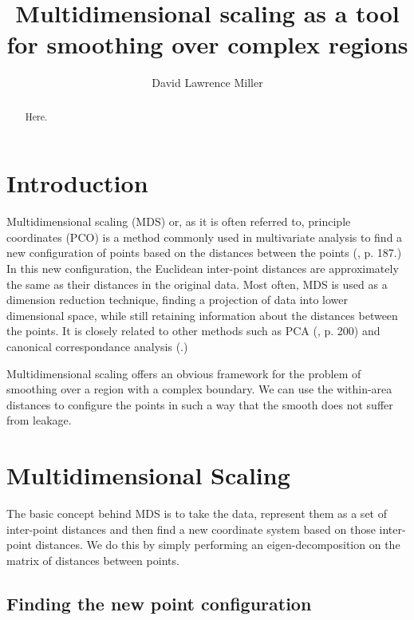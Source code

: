 \documentclass[a4paper,10pt]{amsart}
\title{Multidimensional scaling as a tool for smoothing over complex regions}
\author{David Lawrence Miller}
\begin{document}
 
\begin{abstract}
Here.
\end{abstract}
 
 
\newtheorem{thm}{Theorem}[section]
 
\newtheorem{defn}{Definition}[section]
 
\maketitle


\section{Introduction}

Multidimensional scaling (MDS) or, as it is often referred to, principle coordinates (PCO) is a method commonly used in multivariate analysis to find a new configuration of points based on the distances between the points (\cite{chatfieldcollins}, p. 187.) In this new configuration, the Euclidean inter-point distances are approximately the same as their distances in the original data. Most often, MDS is used as a dimension reduction technique, finding a projection of data into lower dimensional space, while still retaining information about the distances between the points. It is closely related to other methods such as PCA (\cite{chatfieldcollins}, p. 200) and canonical correspondance analysis (\cite{terbraak}.)

Multidimensional scaling offers an obvious framework for the problem of smoothing over a region with a complex boundary. We can use the within-area distances to configure the points in such a way that the smooth does not suffer from leakage.

\section{Multidimensional Scaling}

The basic concept behind MDS is to take the data, represent them as a set of inter-point distances and then find a new coordinate system based on those inter-point distances. We do this by simply performing an eigen-decomposition on the matrix of distances between points.

\subsection{Finding the new point configuration}
\end{document}
